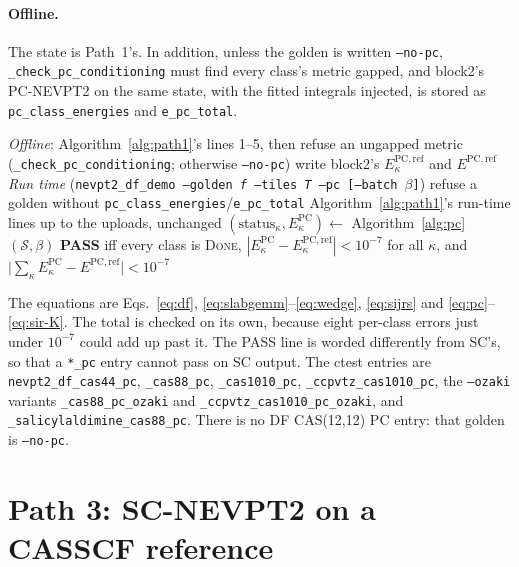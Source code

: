 \documentclass[11pt]{article}
\newcommand{\code}[1]{\texttt{#1}}
\begin{document}
\paragraph{Offline.} The state is Path~1's. In addition, unless the golden is
written \code{--no-pc}, \code{\_check\_pc\_conditioning} must find every
class's metric gapped, and block2's PC-NEVPT2 on the same state, with the
fitted integrals injected, is stored as \code{pc\_class\_energies} and
\code{e\_pc\_total}.

\begin{algorithm}[htbp]
\caption{Path 2, PC on CASCI orbitals}
\label{alg:path2}
\begin{algorithmic}[1]
\Statex \textit{Offline}: Algorithm~\ref{alg:path1}'s lines 1--5, then
\State refuse an ungapped metric (\code{\_check\_pc\_conditioning}; otherwise \code{--no-pc})
\State write block2's $E^{\mathrm{PC,ref}}_\kappa$ and $E^{\mathrm{PC,ref}}$
\Statex \textit{Run time} (\code{nevpt2\_df\_demo --golden \textit{f} --tiles \textit{T} --pc [--batch $\beta$]})
\State refuse a golden without \code{pc\_class\_energies}/\code{e\_pc\_total} 
\State Algorithm~\ref{alg:path1}'s run-time lines up to the uploads, unchanged
\State $(\text{status}_\kappa, E^{\mathrm{PC}}_\kappa) \gets$ Algorithm~\ref{alg:pc}$(\mathcal S, \beta)$
\State \textbf{PASS} iff every class is \textsc{Done}, $|E^{\mathrm{PC}}_\kappa - E^{\mathrm{PC,ref}}_\kappa| < 10^{-7}$ for all $\kappa$, and $\bigl|\sum_\kappa E^{\mathrm{PC}}_\kappa - E^{\mathrm{PC,ref}}\bigr| < 10^{-7}$
\end{algorithmic}
\end{algorithm}

The equations are Eqs.~\eqref{eq:df}, \eqref{eq:slabgemm}--\eqref{eq:wedge},
\eqref{eq:sijrs} and \eqref{eq:pc}--\eqref{eq:sir-K}. The total is checked on
its own, because eight per-class errors just under $10^{-7}$ could add up past
it. The PASS line is worded differently from SC's, so that a \code{*\_pc}
entry cannot pass on SC output. The ctest entries are
\code{nevpt2\_df\_cas44\_pc}, \code{\_cas88\_pc}, \code{\_cas1010\_pc},
\code{\_ccpvtz\_cas1010\_pc}, the \code{--ozaki} variants
\code{\_cas88\_pc\_ozaki} and \code{\_ccpvtz\_cas1010\_pc\_ozaki}, and
\code{\_salicylaldimine\_cas88\_pc}. There is no DF CAS(12,12) PC entry: that
golden is \code{--no-pc}.

\section{Path 3: SC-NEVPT2 on a CASSCF reference}
\label{sec:sc-casscf}
\end{document}
